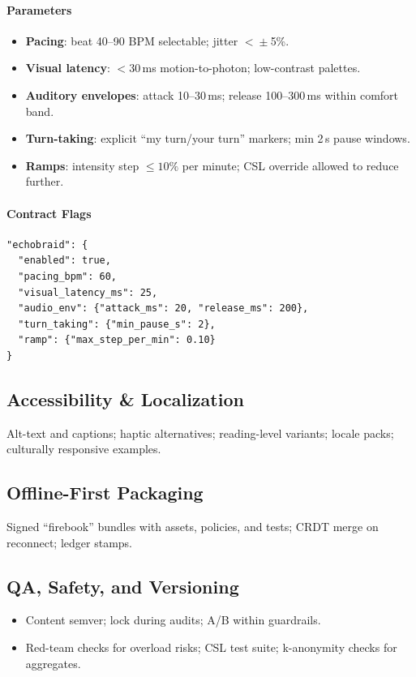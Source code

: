 \documentclass[11pt]{article}
\theoremstyle{plain}
\begin{document}
\paragraph{Parameters}
\begin{itemize}
  \item \textbf{Pacing}: beat 40--90 BPM selectable; jitter $<\!\pm$5\%.
  \item \textbf{Visual latency}: $<30$\,ms motion-to-photon; low-contrast palettes.
  \item \textbf{Auditory envelopes}: attack 10--30\,ms; release 100--300\,ms within comfort band.
  \item \textbf{Turn-taking}: explicit ``my turn/your turn'' markers; min 2\,s pause windows.
  \item \textbf{Ramps}: intensity step $\le 10\%$ per minute; CSL override allowed to reduce further.
\end{itemize}

\paragraph{Contract Flags}
\begin{verbatim}
"echobraid": {
  "enabled": true,
  "pacing_bpm": 60,
  "visual_latency_ms": 25,
  "audio_env": {"attack_ms": 20, "release_ms": 200},
  "turn_taking": {"min_pause_s": 2},
  "ramp": {"max_step_per_min": 0.10}
}
\end{verbatim}

\subsection{Accessibility \& Localization}
Alt-text and captions; haptic alternatives; reading-level variants; locale packs; culturally responsive examples.

\subsection{Offline-First Packaging}
Signed ``firebook'' bundles with assets, policies, and tests; CRDT merge on reconnect; ledger stamps.

\subsection{QA, Safety, and Versioning}
\begin{itemize}
  \item Content semver; lock during audits; A/B within guardrails.
  \item Red-team checks for overload risks; CSL test suite; k-anonymity checks for aggregates.
\end{itemize}
\end{document}
